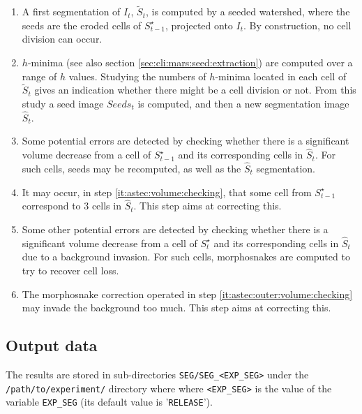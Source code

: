\begin{enumerate}
\item \label{it:astec:projected:segmentation} A first segmentation of $I_{t}$, $\tilde{S}_{t}$, is computed by a seeded watershed, where the seeds are the eroded cells of $S^\star_{t-1}$, projected onto $I_{t}$. By construction, no cell division can occur.
\item \label{it:astec:optimal:seeds} $h$-minima (see also section 
\ref{sec:cli:mars:seed:extraction}) are computed over a range of $h$ values. Studying the numbers of $h$-minima located in each cell of $\tilde{S}_{t}$ gives an indication whether there might be a cell division or not. From this study a seed image $Seeds_{t}$ is computed, and then a new segmentation image $\hat{S}_{t}$.
\item \label{it:astec:volume:checking} Some potential errors are detected by checking whether there is a significant volume decrease from a cell of $S^\star_{t-1}$ and its corresponding cells in $\hat{S}_{t}$. For such cells, seeds may be recomputed, as well as the $\hat{S}_{t}$ segmentation.
\item \label{it:astec:multiple:label:fusion} It may occur, in step \ref{it:astec:volume:checking}, that some cell from $S^\star_{t-1}$ correspond to 3 cells in $\hat{S}_{t}$. This step aims at correcting this.
\item \label{it:astec:outer:volume:checking} Some other potential errors are detected by checking whether there is a significant volume decrease from a cell of $S^\star_t$ and its corresponding cells in $\hat{S}_{t}$ due to a background invasion. For such cells, morphosnakes \cite{marquez-neil:pami:2014} are computed to try to recover cell loss.
\item \label{it:astec:morphosnake:correction} The morphosnake correction operated in step \ref{it:astec:outer:volume:checking} may invade the background too much. This step aims at correcting this.
\end{enumerate}







\subsection{Output data}
\label{sec:cli:astec:output:data}

The results are stored in sub-directories
\texttt{SEG/SEG\_<EXP\_SEG>} under the
\texttt{/path/to/experiment/} directory where where \texttt{<EXP\_SEG>} is the value of the variable \texttt{EXP\_SEG} (its
default value is '\texttt{RELEASE}'). 

